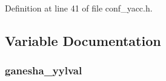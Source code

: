 


Definition at line 41 of file conf\_\-yacc.h.

\subsection{Variable Documentation}
\subsubsection[{ganesha\_\-yylval}]{ {\bf ganesha\_\-yylval}}\label{conf__yacc_8h_a13be7405b90f437bb0c72233b2a8c587}
